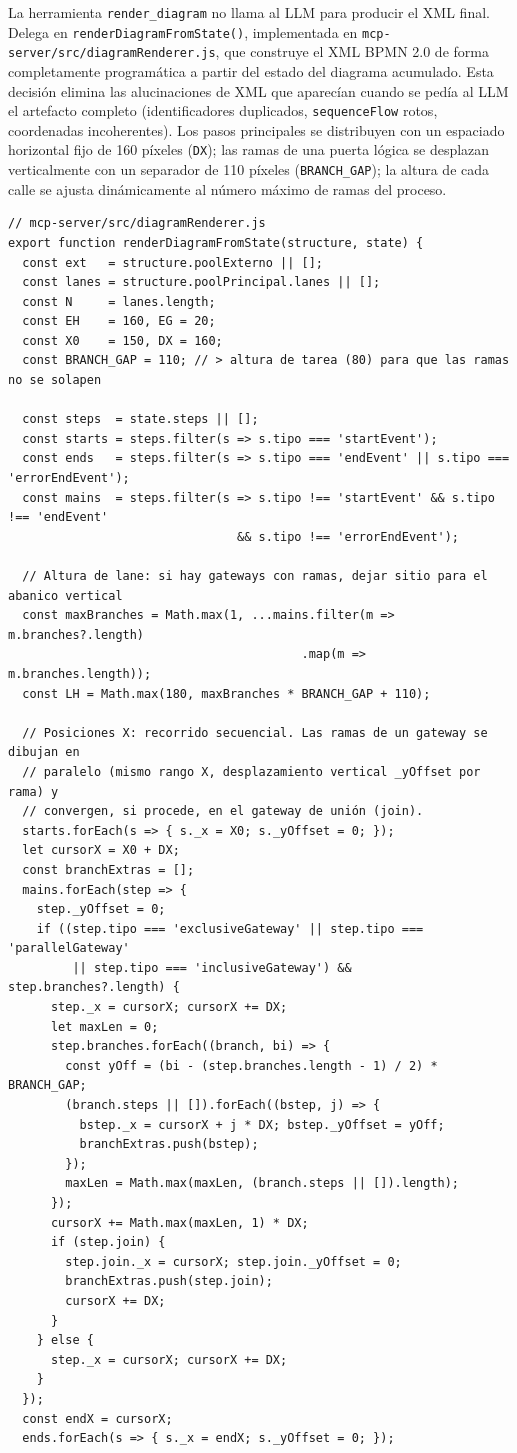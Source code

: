 La herramienta \texttt{render\_diagram} no llama al LLM para producir el XML final. Delega en \texttt{renderDiagramFromState()}, implementada en \texttt{mcp-server/src/diagramRenderer.js}, que construye el XML BPMN 2.0 de forma completamente programática a partir del estado del diagrama acumulado. Esta decisión elimina las alucinaciones de XML que aparecían cuando se pedía al LLM el artefacto completo (identificadores duplicados, \texttt{sequenceFlow} rotos, coordenadas incoherentes). Los pasos principales se distribuyen con un espaciado horizontal fijo de 160 píxeles (\texttt{DX}); las ramas de una puerta lógica se desplazan verticalmente con un separador de 110 píxeles (\texttt{BRANCH\_GAP}); la altura de cada calle se ajusta dinámicamente al número máximo de ramas del proceso.

\begin{lstlisting}[style=promptbox]
// mcp-server/src/diagramRenderer.js
export function renderDiagramFromState(structure, state) {
  const ext   = structure.poolExterno || [];
  const lanes = structure.poolPrincipal.lanes || [];
  const N     = lanes.length;
  const EH    = 160, EG = 20;
  const X0    = 150, DX = 160;
  const BRANCH_GAP = 110; // > altura de tarea (80) para que las ramas no se solapen

  const steps  = state.steps || [];
  const starts = steps.filter(s => s.tipo === 'startEvent');
  const ends   = steps.filter(s => s.tipo === 'endEvent' || s.tipo === 'errorEndEvent');
  const mains  = steps.filter(s => s.tipo !== 'startEvent' && s.tipo !== 'endEvent'
                                && s.tipo !== 'errorEndEvent');

  // Altura de lane: si hay gateways con ramas, dejar sitio para el abanico vertical
  const maxBranches = Math.max(1, ...mains.filter(m => m.branches?.length)
                                         .map(m => m.branches.length));
  const LH = Math.max(180, maxBranches * BRANCH_GAP + 110);

  // Posiciones X: recorrido secuencial. Las ramas de un gateway se dibujan en
  // paralelo (mismo rango X, desplazamiento vertical _yOffset por rama) y
  // convergen, si procede, en el gateway de unión (join).
  starts.forEach(s => { s._x = X0; s._yOffset = 0; });
  let cursorX = X0 + DX;
  const branchExtras = [];
  mains.forEach(step => {
    step._yOffset = 0;
    if ((step.tipo === 'exclusiveGateway' || step.tipo === 'parallelGateway'
         || step.tipo === 'inclusiveGateway') && step.branches?.length) {
      step._x = cursorX; cursorX += DX;
      let maxLen = 0;
      step.branches.forEach((branch, bi) => {
        const yOff = (bi - (step.branches.length - 1) / 2) * BRANCH_GAP;
        (branch.steps || []).forEach((bstep, j) => {
          bstep._x = cursorX + j * DX; bstep._yOffset = yOff;
          branchExtras.push(bstep);
        });
        maxLen = Math.max(maxLen, (branch.steps || []).length);
      });
      cursorX += Math.max(maxLen, 1) * DX;
      if (step.join) {
        step.join._x = cursorX; step.join._yOffset = 0;
        branchExtras.push(step.join);
        cursorX += DX;
      }
    } else {
      step._x = cursorX; cursorX += DX;
    }
  });
  const endX = cursorX;
  ends.forEach(s => { s._x = endX; s._yOffset = 0; });


\end{lstlisting}
